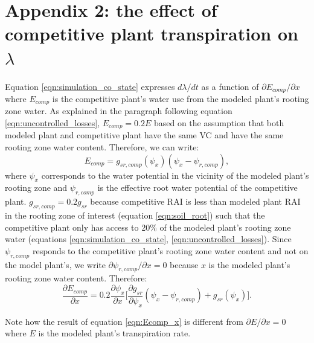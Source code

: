 \documentclass[utf8]{frontiersSCNS} %
\begin{document}
\section*{Appendix 2: the effect of competitive plant transpiration on $\lambda$}
Equation \ref{eqn:simulation_co_state} expresses $d \lambda / dt$ as a function of $\partial E_{comp} / \partial x$ where $E_{comp}$ is the competitive plant's water use from the modeled plant's rooting zone water. As explained in the paragraph following equation \ref{eqn:uncontrolled_losses}, $E_{comp}=0.2E$ based on the assumption that both modeled plant and competitive plant have the same VC and have the same rooting zone water content. Therefore, we can write:
\begin{equation}
    \label{eqn:E_comp}
    E_{comp} = g_{sr,comp}(\psi_x)(\psi_x - \psi_{r,comp}),
\end{equation}
where $\psi_x$ corresponds to the water potential in the vicinity of the modeled plant's rooting zone and $\psi_{r,comp}$ is the effective root water potential of the competitive plant. $g_{sr,comp} = 0.2 g_{sr}$ because competitive RAI is less than modeled plant RAI in the rooting zone of interest (equation \ref{eqn:soil_root}) such that the competitive plant only has access to 20\% of the modeled plant's rooting zone water (equations \ref{eqn:simulation_co_state}, \ref{eqn:uncontrolled_losses}). Since $\psi_{r,comp}$ responds to the competitive plant's rooting zone water content and not on the model plant's, we write $\partial \psi_{r,comp} / \partial x = 0$ because $x$ is the modeled plant's rooting zone water content. Therefore:
\begin{equation}
    \label{eqn:Ecomp_x}
    \frac{\partial E_{comp}}{\partial x} = 0.2 \frac{\partial \psi_x}{\partial x} \Bigg[ \frac{\partial g_{sr}}{\partial \psi_x} (\psi_x - \psi_{r,comp}) + g_{sr}(\psi_x) \Bigg].
\end{equation}

Note how the result of equation \ref{eqn:Ecomp_x} is different from $\partial E / \partial x = 0$ where $E$ is the modeled plant's transpiration rate.



\end{document}
